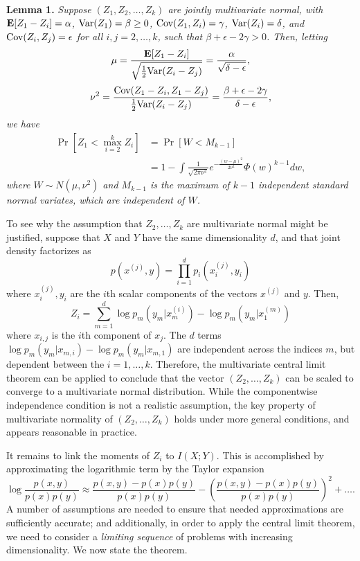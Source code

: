 \textbf{Lemma 1. }
\emph{
Suppose $(Z_1, Z_2, \hdots, Z_k)$ are jointly multivariate normal, with 
$\textbf{E}[Z_1 - Z_i]= \alpha$, 
$\text{Var}(Z_1) = \beta \geq 0$, 
$\text{Cov}(Z_1, Z_i) = \gamma$, 
$\text{Var}(Z_i)= \delta$, and $\text{Cov}(Z_i, Z_j) = \epsilon$ for all $i, j = 2, \hdots,
k$, such that $\beta + \epsilon - 2\gamma > 0$.  Then, letting
\[
\mu = \frac{\textbf{E}[Z_1 - Z_i]}{\sqrt{\frac{1}{2}\text{Var}(Z_i - Z_j)}} = \frac{\alpha}{\sqrt{\delta - \epsilon}},
\]
\[
\nu^2 = \frac{\text{Cov}(Z_1 -Z_i, Z_1 - Z_j)}{\frac{1}{2}\text{Var}(Z_i - Z_j)} = \frac{\beta + \epsilon - 2\gamma}{\delta - \epsilon},
\]
we have
\begin{align*}
\Pr[Z_1 < \max_{i=2}^k Z_i] &= \Pr[W < M_{k-1}]
\\&= 1 - \int \frac{1}{\sqrt{2\pi\nu^2}} e^{-\frac{(w-\mu)^2}{2\nu^2}} \Phi(w)^{k-1} dw,
\end{align*}
where $W \sim N(\mu, \nu^2)$ and $M_{k-1}$ is the maximum of $k-1$
independent standard normal variates, which are independent of $W$.
}

To see why the assumption that $Z_2,\hdots, Z_k$ are multivariate normal might be justified, suppose that $X$ and $Y$ have the same dimensionality $d$, and that
joint density factorizes as
\[
p(x^{(j)}, y) = \prod_{i=1}^d p_i(x^{(j)}_i, y_i)
\]
where $x_i^{(j)}, y_i$ are the $i$th scalar components of the vectors $x^{(j)}$ and $y$.
Then,
\[
Z_i = \sum_{m=1}^d \log p_m(y_m | x^{(i)}_m) - \log p_m(y_m | x^{(m)}_1)
\]
where $x_{i, j}$ is the $i$th component of $x_j$.  The $d$ terms $\log
p_m(y_m | x_{m, i}) - \log p_m(y_m | x_{m, 1})$ are independent across
the indices $m$, but dependent between the $i = 1,\hdots, k$.
Therefore, the multivariate central limit theorem can be applied to
conclude that the vector $(Z_2,\hdots, Z_k)$ can be scaled to converge
to a multivariate normal distribution.  While the componentwise
independence condition is not a realistic assumption, the key property
of multivariate normality of $(Z_2,\hdots, Z_k)$ holds under more
general conditions, and appears reasonable in practice.

It remains to link the moments of $Z_i$ to $I(X;Y)$.  This is accomplished by approximating the logarithmic term by the Taylor expansion
\[
\log \frac{p(x, y)}{p(x) p(y)} \approx \frac{p(x, y) - p(x) p(y)}{p(x) p(y)} - \left(\frac{p(x, y) - p(x) p(y)}{p(x) p(y)}\right)^2 + \hdots.
\]
A number of assumptions are needed to ensure that needed
approximations are sufficiently accurate; and additionally, in order
to apply the central limit theorem, we need to consider a
\emph{limiting sequence} of problems with increasing dimensionality.
We now state the theorem.

